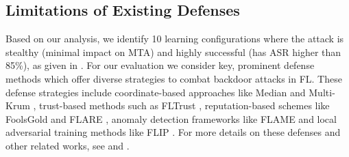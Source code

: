 
\subsection{Limitations of Existing Defenses}
\label{sec:defenses_fail_across_configs}

Based on our analysis, we identify 10 learning configurations where the attack is stealthy (minimal impact on MTA) and highly successful (has ASR higher than 85\%), as given in . For our evaluation we consider key, prominent defense methods which offer diverse strategies to combat backdoor attacks in FL. These defense strategies include coordinate-based approaches like Median \citep{yin2018byzantine} and Multi-Krum \citep{blanchard2017machine}, trust-based methods such as FLTrust \citep{cao2021fltrust}, reputation-based schemes like FoolsGold \citep{fung2018mitigating} and FLARE \citep{wang2022flare}, anomaly detection frameworks like FLAME \citep{nguyen2022flame} and local adversarial training methods like FLIP \citep{zhang2023flip}. For more details on these defenses and other related works, see  and .

